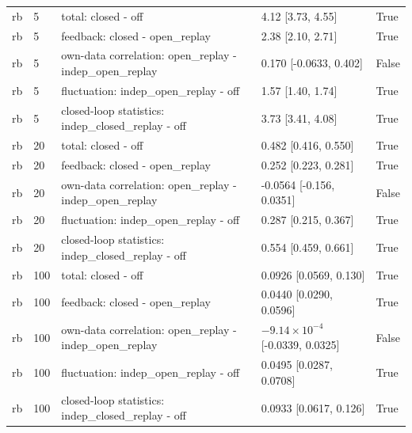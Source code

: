 {\begin{longtable}{lllll}
rb & 5 & total: closed - off & 4.12 [3.73, 4.55] & True \\
rb & 5 & feedback: closed - open\_replay & 2.38 [2.10, 2.71] & True \\
rb & 5 & own-data correlation: open\_replay - indep\_open\_replay & 0.170 [-0.0633, 0.402] & False \\
rb & 5 & fluctuation: indep\_open\_replay - off & 1.57 [1.40, 1.74] & True \\
rb & 5 & closed-loop statistics: indep\_closed\_replay - off & 3.73 [3.41, 4.08] & True \\
rb & 20 & total: closed - off & 0.482 [0.416, 0.550] & True \\
rb & 20 & feedback: closed - open\_replay & 0.252 [0.223, 0.281] & True \\
rb & 20 & own-data correlation: open\_replay - indep\_open\_replay & -0.0564 [-0.156, 0.0351] & False \\
rb & 20 & fluctuation: indep\_open\_replay - off & 0.287 [0.215, 0.367] & True \\
rb & 20 & closed-loop statistics: indep\_closed\_replay - off & 0.554 [0.459, 0.661] & True \\
rb & 100 & total: closed - off & 0.0926 [0.0569, 0.130] & True \\
rb & 100 & feedback: closed - open\_replay & 0.0440 [0.0290, 0.0596] & True \\
rb & 100 & own-data correlation: open\_replay - indep\_open\_replay & $-9.14\times10^{-4}$ [-0.0339, 0.0325] & False \\
rb & 100 & fluctuation: indep\_open\_replay - off & 0.0495 [0.0287, 0.0708] & True \\
rb & 100 & closed-loop statistics: indep\_closed\_replay - off & 0.0933 [0.0617, 0.126] & True \\
\bottomrule
\end{longtable}
}
